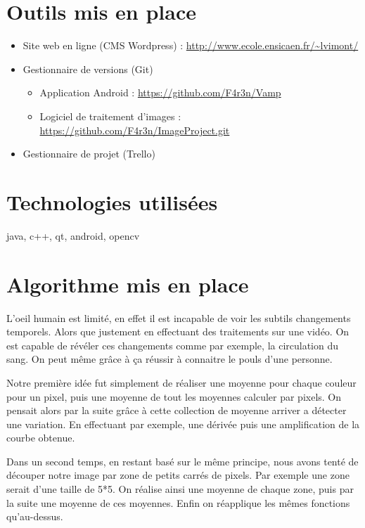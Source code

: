 \section{Outils mis en place}

\begin{itemize}
	\item Site web en ligne (CMS Wordpress) : \url{http://www.ecole.ensicaen.fr/~lvimont/} 
	\item Gestionnaire de versions (Git) 
		\begin{itemize}[label=\textbullet]
			\item Application Android : \url{https://github.com/F4r3n/Vamp} 
			\item Logiciel de traitement d'images : \url{https://github.com/F4r3n/ImageProject.git} 
		\end{itemize}
	\item Gestionnaire de projet (Trello)
\end{itemize}

\section{Technologies utilisées}

java, c++, qt, android, opencv

\section{Algorithme mis en place}

L'oeil humain est limité, en effet il est incapable de voir les subtils changements temporels. Alors
que justement en effectuant des traitements sur une vidéo. On est capable de révéler ces changements
comme par exemple, la circulation du sang. On peut même grâce à ça réussir à connaitre le pouls d'une
personne. 

Notre première idée fut simplement de réaliser une moyenne pour chaque couleur pour un pixel, puis 
une moyenne de tout les moyennes calculer par pixels. On pensait alors par la suite grâce à cette 
collection de moyenne arriver a détecter une variation. En effectuant par exemple, une dérivée puis
une amplification de la courbe obtenue.  

Dans un second temps, en restant basé sur le même principe, nous avons tenté de découper notre image
par zone de petits carrés de pixels. Par exemple une zone serait d'une taille de 5*5. On réalise 
ainsi une moyenne de chaque zone, puis par la suite une moyenne de ces moyennes. Enfin on réapplique
les mêmes fonctions qu'au-dessus.

